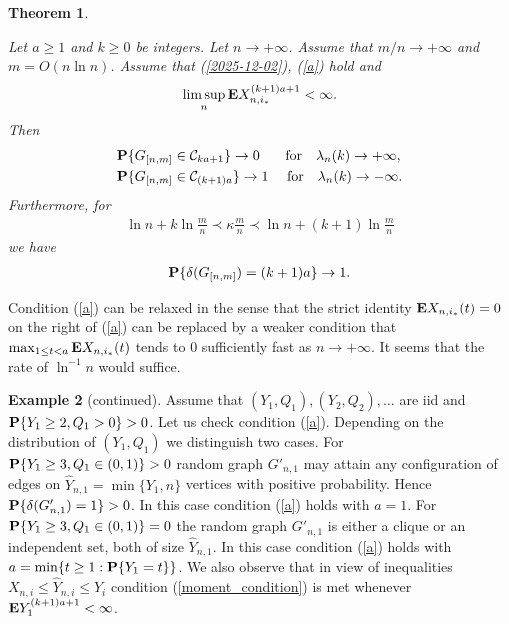 \documentclass[11pt, a4paper]{article}
\newcommand{\E}{{\bf{E}}}
\newcommand{\PP}{{\bf{P}}}
\newtheorem{tm}{Theorem}
\begin{document}
\begin{tm}\label{T2}
  
Let  $a\ge 1$ and $k\ge 0$ be integers. Let $n\to+\infty$.
Assume that  $m/n\to+\infty$ and $m=O(n\ln n)$.
Assume that 
(\ref{2025-12-02}),
(\ref{a})
hold and 
\begin{align}
\label{moment_condition}
\limsup_n\E X_{n,i_*}^{(k+1)a+1}<\infty. 
\end{align}
Then 
\begin{align}
\label{2026-01-20+1}
&
\PP\{G_{[n,m]}\in {\cal C}_{ka+1}\}
\to
0
\quad
\
\,
{\text{ for}}
\quad
\lambda_n(k)\to+\infty,
\\
\label{2025-08-25+r}
&
\PP\{G_{[n,m]}\in {\cal C}_{(k+1)a}\}
\to
1
\quad
{\text{ for}}
\quad
\lambda_n(k)\to-\infty.
\end{align}
Furthermore, for 
\begin{align}
\label{2026-01-21}
\ln n+k\ln\frac{m}{n}\prec\kappa\frac{m}{n}\prec 
\ln n+(k+1)\ln\frac{m}{n}
\end{align}
we have  
\begin{align}
\label{degree}
\PP\{\delta(G_{[n,m]})=(k+1)a\}\to 1.
\end{align}
\end{tm}

Condition (\ref{a}) can be relaxed in the sense that the strict identity $\E X_{n,i_*}(t)=0$ on the right of (\ref{a}) can be replaced by a weaker condition that $\max_{1\le t<a}\E X_{n,i_*}(t)$ tends to $0$ sufficiently fast as $n\to+\infty$. It seems that the rate of 
$\ln^{-1} n$ would suffice.

 {\bf Example 2} (continued). Assume that $(Y_1,Q_1),(Y_2,Q_2),\dots$ are iid and $\PP\{Y_1\ge 2, Q_1>0\}>0$. Let us check condition (\ref{a}).
 Depending on the distribution of $(Y_1,Q_1)$ we distinguish two cases. For 
 $\PP\{Y_1\ge 3, Q_1\in(0,1)\}>0$ 
 random graph $G'_{n,1}$ may attain any configuration 
 of edges on 
 ${\hat Y}_{n,1}=\min\{Y_1,n\}$ vertices with positive probability. 
 Hence $\PP\{\delta(G'_{n,1})=1\}>0$. In this case  condition (\ref{a}) holds with 
$a=1$. For $\PP\{Y_1\ge 3, Q_1\in(0,1)\}=0$ the random graph $G'_{n,1}$ is either a clique 
or an independent set, both of size ${\hat Y}_{n,1}$. In this case condition (\ref{a}) holds with  $a=\min\{t\ge 1: \PP\{Y_1=t\}\}$.
We also observe that in view of inequalities
$X_{n,i}\le {\hat Y}_{n,i}\le Y_i$
 condition (\ref{moment_condition}) is met whenever $\E Y_1^{(k+1)a+1}<\infty$. 
\end{document}
